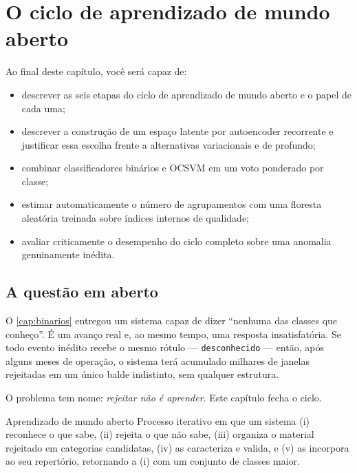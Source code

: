 \chapter{O ciclo de aprendizado de mundo aberto}
\label{cap:mundoaberto}

\begin{objetivos}
Ao final deste capítulo, você será capaz de:
\begin{itemize}[leftmargin=*,itemsep=0.2em]
  \item descrever as seis etapas do ciclo de aprendizado de mundo aberto e o papel de
        cada uma;
  \item descrever a construção de um espaço latente por autoencoder recorrente e
        justificar essa escolha frente a alternativas variacionais e de
         profundo;
  \item combinar classificadores binários e OCSVM em um voto ponderado por classe;
  \item estimar automaticamente o número de agrupamentos com uma floresta aleatória
        treinada sobre índices internos de qualidade;
  \item avaliar criticamente o desempenho do ciclo completo sobre uma anomalia
        genuinamente inédita.
\end{itemize}
\end{objetivos}

\section{A questão em aberto}

O \cref{cap:binarios} entregou um sistema capaz de dizer ``nenhuma das classes que
conheço''. É um avanço real e, ao mesmo tempo, uma resposta insatisfatória. Se todo
evento inédito recebe o mesmo rótulo --- \texttt{desconhecido} --- então, após alguns
meses de operação, o sistema terá acumulado milhares de janelas rejeitadas em um único
balde indistinto, sem qualquer estrutura.

O problema tem nome: \emph{rejeitar não é aprender}. Este capítulo fecha o ciclo.

\begin{definicao}{Aprendizado de mundo aberto}
Processo iterativo em que um sistema (i) reconhece o que sabe, (ii) rejeita o que não
sabe, (iii) organiza o material rejeitado em categorias candidatas, (iv) as caracteriza
e valida, e (v) as incorpora ao seu repertório, retornando a (i) com um conjunto de
classes maior.
\end{definicao}


